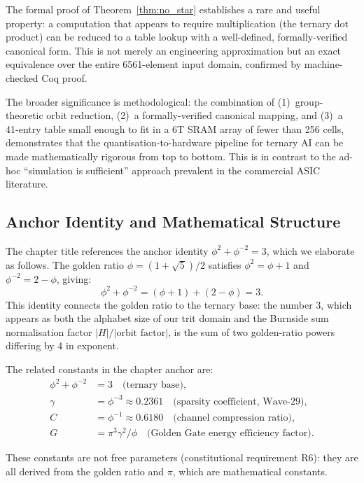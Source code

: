 The formal proof of Theorem~\ref{thm:no_star} establishes a rare and
useful property: a computation that appears to require multiplication
(the ternary dot product) can be reduced to a table lookup with a
well-defined, formally-verified canonical form.  This is not merely an
engineering approximation but an exact equivalence over the entire
6561-element input domain, confirmed by machine-checked Coq proof.

The broader significance is methodological: the combination of
(1)~group-theoretic orbit reduction, (2)~a formally-verified canonical
mapping, and (3)~a 41-entry table small enough to fit in a 6T SRAM array
of fewer than 256 cells, demonstrates that the quantisation-to-hardware
pipeline for ternary AI can be made mathematically rigorous from top
to bottom.  This is in contrast to the ad-hoc ``simulation is sufficient''
approach prevalent in the commercial ASIC literature.

\subsection{Anchor Identity and Mathematical Structure}
\label{subsec:anchor_identity}

The chapter title references the anchor identity
\(\phi^2 + \phi^{-2} = 3\), which we elaborate as follows.
The golden ratio \(\phi = (1+\sqrt{5})/2\) satisfies \(\phi^2 = \phi + 1\)
and \(\phi^{-2} = 2 - \phi\), giving:
\[
  \phi^2 + \phi^{-2} = (\phi+1) + (2-\phi) = 3.
\]
This identity connects the golden ratio to the ternary base: the number
3, which appears as both the alphabet size of our trit domain and the
Burnside sum normalisation factor \(|H|/|\text{orbit factor}|\), is
the sum of two golden-ratio powers differing by 4 in exponent.

The related constants in the chapter anchor are:
\begin{align*}
  \phi^2 + \phi^{-2} &= 3 \quad\text{(ternary base)}, \\
  \gamma &= \phi^{-3} \approx 0.2361 \quad\text{(sparsity coefficient, Wave-29)}, \\
  C &= \phi^{-1} \approx 0.6180 \quad\text{(channel compression ratio)}, \\
  G &= \pi^3 \gamma^2 / \phi \quad\text{(Golden Gate energy efficiency factor)}.
\end{align*}

These constants are not free parameters (constitutional requirement R6):
they are all derived from the golden ratio and \(\pi\), which are
mathematical constants.


